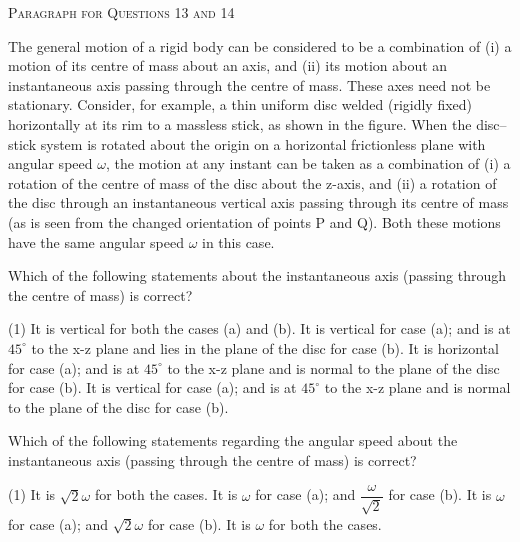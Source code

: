 
\begin{center}
    \textsc{Paragraph for Questions 13 and 14}
\end{center}

The general motion of a rigid body can be considered to be a combination of (i) a motion of its centre of mass about an axis, and (ii) its motion about an instantaneous axis passing through the centre of mass. These axes need not be stationary. Consider, for example, a thin uniform disc welded (rigidly fixed) horizontally at its rim to a massless stick, as shown in the figure. When the disc--stick system is rotated about the origin on a horizontal frictionless plane with angular speed $\omega$, the motion at any instant can be taken as a combination of (i) a rotation of the centre of mass of the disc about the z-axis, and (ii) a rotation of the disc through an instantaneous vertical axis passing through its centre of mass (as is seen from the changed orientation of points P and Q). Both these motions have the same angular speed $\omega$ in this case.

\begin{center}
    \begin{tikzpicture}


    \end{tikzpicture}
\end{center} 

\item Which of the following statements about the instantaneous axis (passing through the centre of mass) is correct?
    \begin{tasks}(1)
        \task It is vertical for both the cases (a) and (b).
        \task It is vertical for case (a); and is at $45^{\circ}$ to the x-z plane and lies in the plane of the disc for case (b).
        \task It is horizontal for case (a); and is at $45^{\circ}$ to the x-z plane and is normal to the plane of the disc for case (b).
        \task It is vertical for case (a); and is at $45^{\circ}$ to the x-z plane and is normal to the plane of the disc for case (b).
    \end{tasks}

\item Which of the following statements regarding the angular speed about the instantaneous axis (passing through the centre of mass) is correct?
    \begin{tasks}(1)
        \task It is $\sqrt{2}\omega$ for both the cases.
        \task It is $\omega$ for case (a); and $\dfrac{\omega}{\sqrt{2}}$ for case (b).
        \task It is $\omega$ for case (a); and $\sqrt{2}\omega$ for case (b).
        \task It is $\omega$ for both the cases.
    \end{tasks}
